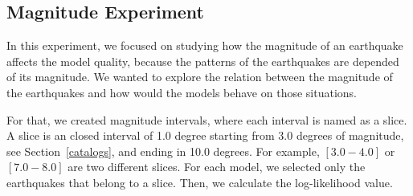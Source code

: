 %
%
%




\subsection{Magnitude Experiment}\label{magExp}

In this experiment, we focused on studying how the magnitude of an earthquake affects the model quality, because the patterns of the earthquakes are depended of its magnitude. We wanted to explore the relation between the magnitude of the earthquakes and how would the models behave on those situations.

For that, we created magnitude intervals, where each interval is named as a slice. A slice is an closed interval of 1.0 degree  starting from 3.0 degrees of magnitude, see Section~\ref{catalogs}, and ending in 10.0 degrees. For example, $[3.0-4.0]$ or $[7.0-8.0]$ are two different slices. For each model, we selected only the earthquakes that belong to a slice. Then, we calculate the log-likelihood value.
